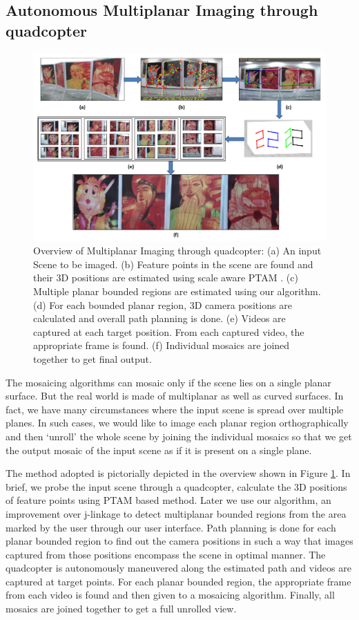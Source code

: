 \subsection{Autonomous Multiplanar Imaging through quadcopter}
\begin{figure}[h!]
\centering
\includegraphics[width=0.98\linewidth]{figures/multiplanar/workflow}
\caption[Overflow of autonomous multiplanar imaging through quadcopter]{Overview
of Multiplanar Imaging through quadcopter:
(a) An input Scene to be imaged.
(b) Feature points in the scene are found and their 3D positions are estimated
using scale aware PTAM \cite{Engel12}. (c) Multiple planar bounded regions are
estimated using our algorithm. (d) For each bounded planar region, 3D camera
positions are calculated and overall path planning is done. (e) Videos are
captured at each target position. From each captured video, the appropriate
frame is found. (f) Individual mosaics are joined together to get final output.}
\label{fig:multiplanar_workflow}
\end{figure}

The mosaicing algorithms can mosaic only if the scene lies on a single planar
surface. But the real world is made of multiplanar as well as curved surfaces.
In fact, we have many circumstances where the input scene is spread over
multiple planes. In such cases, we would like to image each planar region
orthographically and then `unroll' the whole scene by joining the individual
mosaics so that we get the output mosaic of the input scene as if it is present
on a single plane.

The method adopted is pictorially depicted in the overview shown in Figure
\ref{fig:multiplanar_workflow}. In brief, we probe the
input scene through a quadcopter, calculate the 3D positions of feature points
using PTAM based method\cite{engel}. Later we use our algorithm, an improvement
over j-linkage\cite{jlinkage} to detect multiplanar bounded regions from the area
marked by the user through our user interface. Path planning is done for each
planar bounded region to find out the camera positions in such a way
that images captured from those positions encompass the scene in optimal manner.
The quadcopter is autonomously maneuvered along the estimated path and videos
are captured at target points. For each planar bounded region, the appropriate
frame from each video is found and then given to a mosaicing algorithm. 
Finally, all mosaics are joined together to get a full unrolled view.

